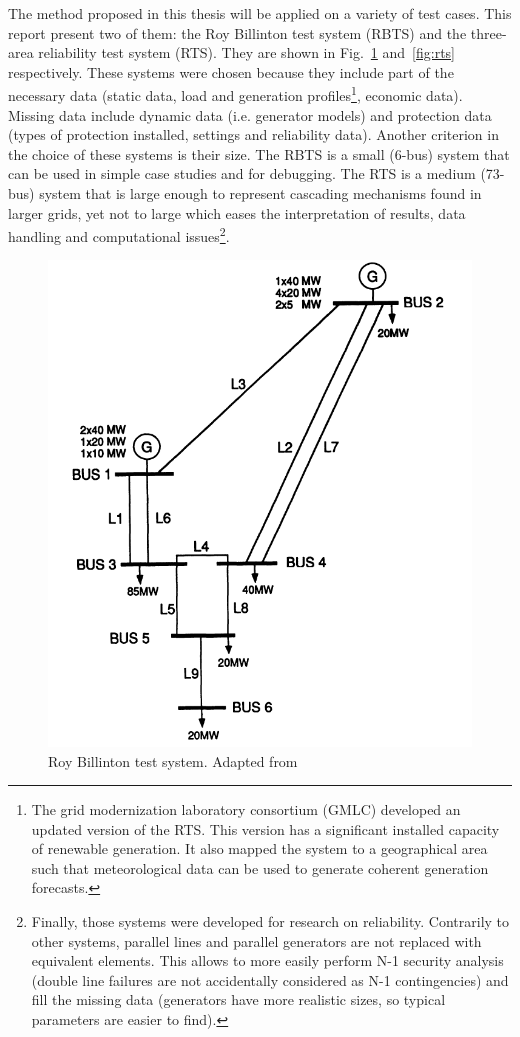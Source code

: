The method proposed in this thesis will be applied on a variety of test cases. This report present two of them: the Roy Billinton test system (RBTS) and the three-area reliability test system (RTS). They are shown in Fig.~\ref{fig:rbts-ch6} and~\ref{fig:rts} respectively. These systems were chosen because they include part of the necessary data (static data, load and generation profiles\footnote{The grid modernization laboratory consortium (GMLC) developed an updated version of the RTS. This version has a significant installed capacity of renewable generation. It also mapped the system to a geographical area such that meteorological data can be used to generate coherent generation forecasts.}, economic data). Missing data include dynamic data (i.e. generator models) and protection data (types of protection installed, settings and reliability data). Another criterion in the choice of these systems is their size. The RBTS is a small (6-bus) system that can be used in simple case studies and for debugging. The RTS is a medium (73-bus) system that is large enough to represent cascading mechanisms found in larger grids, yet not to large which eases the interpretation of results, data handling and computational issues\footnote{Finally, those systems were developed for research on reliability. Contrarily to other systems, parallel lines and parallel generators are not replaced with equivalent elements. This allows to more easily perform N-1 security analysis (double line failures are not accidentally considered as N-1 contingencies) and fill the missing data (generators have more realistic sizes, so typical parameters are easier to find).}.

\begin{figure}
    \centering
    \includegraphics[width=0.6\linewidth]{Figs/RBTS.png}
    \caption{Roy Billinton test system. Adapted from~\cite{rbts}}
    \label{fig:rbts-ch6}
\end{figure}

